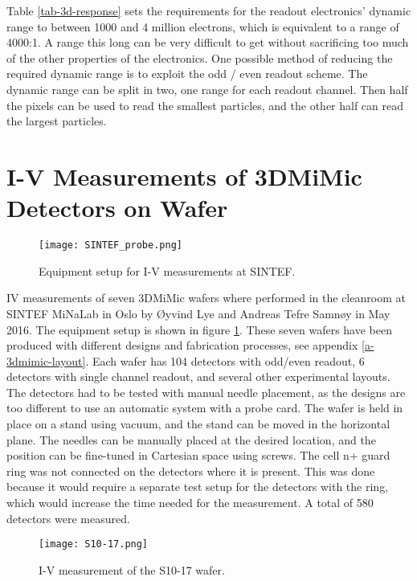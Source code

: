 \documentclass[../main/thesis.tex]{subfiles}
\begin{document}
Table \ref{tab-3d-response} sets the requirements for the readout electronics' dynamic range to between 1000 and 4 million electrons, which is equivalent to a range of 4000:1. A range this long can be very difficult to get without sacrificing too much of the other properties of the electronics. One possible method of reducing the required dynamic range is to exploit the odd / even readout scheme. The dynamic range can be split in two, one range for each readout channel. Then half the pixels can be used to read the smallest particles, and the other half can read the largest particles. 

\section{I-V Measurements of 3DMiMic Detectors on Wafer}
\label{3d-IV}

\begin{figure}%
	\centering
	\texttt{[image: SINTEF\_probe.png]}
	\caption{Equipment setup for I-V measurements at SINTEF. \citep{Yashika}}
	\label{fig-3d-probe} 
\end{figure}

\gls{IV} measurements of seven 3DMiMic wafers where performed in the cleanroom at SINTEF MiNaLab in Oslo by Øyvind Lye and Andreas Tefre Samnøy in May 2016. The equipment setup is shown in figure \ref{fig-3d-probe}. These seven wafers have been produced with different designs and fabrication processes, see appendix \ref{a-3dmimic-layout}. Each wafer has 104 detectors with odd/even readout, 6 detectors with single channel readout, and several other experimental layouts. The detectors had to be tested with manual needle placement, as the designs are too different to use an automatic system with a probe card. The wafer is held in place on a stand using vacuum, and the stand can be moved in the horizontal plane. The needles can be manually placed at the desired location, and the position can be fine-tuned in Cartesian space using screws. The cell n+ guard ring was not connected on the detectors where it is present. This was done because it would require a separate test setup for the detectors with the ring, which would increase the time needed for the measurement. A total of 580 detectors were measured. 

\begin{figure}%
	\centering
	\texttt{[image: S10-17.png]}
	\caption{I-V measurement of the S10-17 wafer. }
	\label{fig-3d-S10-17} 
\end{figure}
\end{document}
